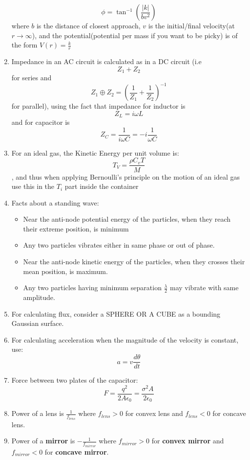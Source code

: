 \documentclass{article}
\numberwithin{equation}{section}
\numberwithin{figure}{section}
\begin{document}
\begin{enumerate}
		\begin{equation}
			\phi=\tan^{-1}\left(\frac{|k|}{bv^2}\right)
		\end{equation}
		where $b$ is the distance of closest approach, $v$ is the initial/final velocity(at $r\rightarrow \infty$), and the potential(potential per mass if you want to be picky) is of the form $V(r)=\frac{k}{r}$
	\item Impedance in an AC circuit is calculated as in a DC circuit (i.e $$Z_1+Z_2$$ for series and $$Z_1\oplus Z_2=\left(\frac{1}{Z_1}+\frac{1}{Z_2}\right)^{-1}$$ for parallel), using the fact that impedance for inductor is $$Z_L=i\omega L$$ and for capacitor is $$Z_C=\frac{1}{i\omega C}=-i\frac{1}{\omega C}$$
	\item For an ideal gas, the Kinetic Energy per unit volume is: $$T_{V}=\frac{\rho C_v T}{M}$$, and thus when applying Bernoulli's principle on the motion of an ideal gas use this in the $T_i$ part inside the container 
	\item Facts about a standing wave:
		\begin{itemize}
			\item Near the anti-node potential energy of the particles, when they reach their extreme position, is minimum
			\item Any two particles vibrates either in same phase or out of phase.
			\item Near the anti-node kinetic energy of the particles, when they crosses their mean position, is maximum.
			\item Any two particles having minimum separation $\frac{\lambda}{2}$  may vibrate with same amplitude.
		\end{itemize}
	\item For calculating flux, consider a SPHERE OR A CUBE as a bounding Gaussian surface.
	\item For calculating acceleration when the magnitude of the velocity is constant, use:
		\begin{equation}
			a=v\frac{d\theta}{dt}
		\end{equation}
	\item Force between two plates of the capacitor:
		\begin{equation}
			F=\frac{q^2}{2A\epsilon_0}=\frac{\sigma^2 A}{2\epsilon_0}
		\end{equation}
	\item Power of a lens is $\frac{1}{f_{lens}}$ where $f_{lens}>0$ for convex lens and $f_{lens}<0$ for concave lens.
	\item Power of a \textbf{mirror} is $-\frac{1}{f_{mirror}}$ where $f_{mirror}>0$ for \textbf{convex mirror} and $f_{mirror}<0$ for \textbf{concave mirror}.

\end{enumerate}
\end{document}
